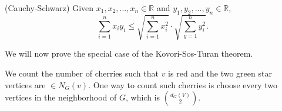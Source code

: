 
\begin{theorem}
	(Cauchy-Schwarz) Given \( x_{1}, x_{2}, \ldots  ,x_n \in \mathbb{R}  \) and \( y_{1}, y_{2}, \ldots , y_n \in \mathbb{R} \), \[
		\sum_{i=1}^{n}x_iy_i \le \sqrt{\sum_{i=1}^{n} x_{i}^{2} } \cdot \sqrt{\sum_{y=1}^{n} y_{i}^{2} } 
	.\] 
\end{theorem}

We will now prove the special case of the Kovori-Sos-Turan theorem.

\begin{replacementproof}
	We count the number of cherries such that \( v \) is red and the two green star vertices are \( \in N_G(v) \). One way to count such cherries is choose every two vertices in the neighborhood of \( G \), which is \( \binom{d_G(V)}{2} \).
\end{replacementproof}
